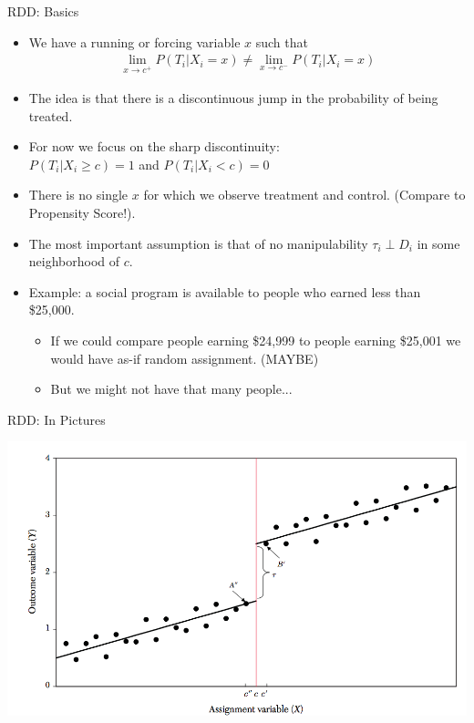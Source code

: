 \begin{frame}{RDD: Basics}
\begin{itemize}
\item We have a \alert{running or forcing variable} $x$ such that 
\begin{eqnarray*}
\lim_{x\rightarrow c^{+}} P(T_i | X_i = x) \neq \lim_{x\rightarrow c^{-}}P(T_i | X_i = x)
\end{eqnarray*}
\item The idea is that there is a \alert{discontinuous jump} in the \alert{probability of being treated}.
\item For now we focus on the \alert{sharp discontinuity}:\\
 $P(T_i | X_i \geq c) =1$ and $P(T_i | X_i < c) =0$
 \item There is no single $x$ for which we observe treatment and control. (Compare to Propensity Score!).
\item The most important assumption is that of \alert{no manipulability} $\tau_i \perp D_i$ in some neighborhood of $c$.
\item Example: a social program is available to people who earned less than \$25,000.
\begin{itemize}              
\item If we could compare people earning \$24,999 to people earning \$25,001 we would have as-if random assignment. (MAYBE)
\item But we might not have that many people...
\end{itemize}
\end{itemize}              
\end{frame}


\begin{frame}{RDD: In Pictures}
\begin{center}
\includegraphics[width= \textwidth]{./resources/ll-fig1}
\end{center}
\end{frame}


